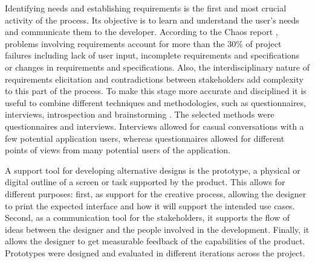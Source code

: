 Identifying needs and establishing requirements is the first and most crucial activity of the process. Its objective is to learn and understand the user's needs and communicate them to the developer. According to the Chaos report \cite{Group1994}, problems involving requirements account for more than the 30\% of project failures including lack of user input, incomplete requirements and specifications or changes in requirements and specifications. Also, the interdisciplinary nature of requirements elicitation and contradictions between stakeholders add complexity to this part of the process. To make this stage more accurate and disciplined it is useful to combine different techniques and methodologies, such as questionnaires, interviews, introspection and brainstorming \cite{Coulin2005}. The selected methods were questionnaires and interviews. Interviews allowed for casual conversations with a few potential application users, whereas questionnaires allowed for different points of views from many potential users of the application. 

A support tool for developing alternative designs is the prototype, a physical or digital outline of a screen or task supported by the product. This allows for different purposes: first, as support for the creative process, allowing the designer to print the expected interface and how it will support the intended use cases. Second, as a communication tool for the stakeholders, it supports the flow of ideas between the designer and the people involved in the development. Finally, it allows the designer to get measurable feedback of the capabilities of the product. Prototypes were designed and evaluated in different iterations across the project.
